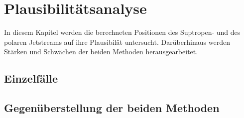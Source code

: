 \chapter{Plausibilitätsanalyse}
In diesem Kapitel werden die berechneten Positionen des Suptropen- und des polaren Jetstreams auf ihre Plausibilät untersucht. Darüberhinaus werden Stärken und Schwächen der beiden Methoden herausgearbeitet.

\section{Einzelfälle}
%   
%
\section{Gegenüberstellung der beiden Methoden}
